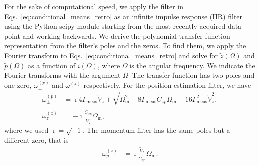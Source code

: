 \documentclass[aps, 
reprint, 
notitlepage,  superscriptaddress, 
onecolumn]{revtex4-1}
\newcommand{\<}{\langle}
\renewcommand{\>}{\rangle}
\newcommand{\Om}{\Omega_\mathrm{m}}
\newcommand{\Gmeas}{\Gamma_\text{meas}}
\begin{document}
For the sake of computational speed, we apply the filter in Eqs.~\eqref{eq:conditional_means_retro} as an infinite impulse response (IIR) filter using the Python scipy module \cite{virtanen_scipy_2020} starting from the most recently acquired data point and working backwards.
%
We derive the polynomial transfer function representation from the filter's poles and the zeros.
%
To find them, we apply the Fourier transform to Eqs.~\eqref{eq:conditional_means_retro} and solve for $\tilde{z}(\Omega)$ and $\tilde{p}(\Omega)$ as a function of $i(\Omega)$, where $\Omega$ is the angular frequency.
%
We indicate the Fourier transforms with the argument $\Omega$.
%
The transfer function has two poles and one zero, $\omega_\pm^{(p)}$ and $\omega^{(z)}$ respectively.
%
For the position estimation filter, we have
\begin{subequations}
\begin{align}
    \omega_{\pm}^{(p)} &= \imath 4\Gmeas\widetilde{V}_z \pm \sqrt{\Om^2-8\Gmeas\widetilde{C}_{zp}\Om - 16\Gmeas^2\widetilde{V}_z^2},\\
    \omega_z^{(z)}&=-\imath\frac{\widetilde{C}_{zp}}{\widetilde{V}_z}\Om,
\end{align}
\end{subequations}
where we used $\imath=\sqrt{-1}$.
The momentum filter has the same poles but a different zero, that is
\begin{eqnarray}
    \omega_p^{(z)}&=\imath\frac{\widetilde{V}_z}{\widetilde{C}_{zp}}\Om.
\end{eqnarray}
\end{document}
